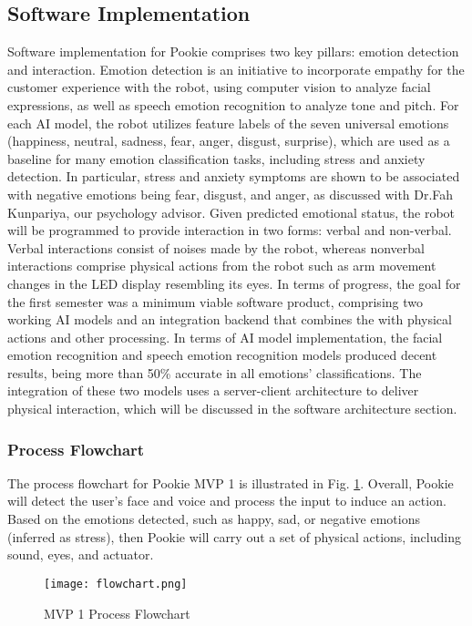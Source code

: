 \subsection{Software Implementation}
Software implementation for Pookie comprises two key pillars: emotion detection and interaction. Emotion detection is an initiative to incorporate empathy for the customer experience with the robot, using computer vision to analyze facial expressions, as well as speech emotion recognition to analyze tone and pitch. For each AI model, the robot utilizes feature labels of the seven universal emotions (happiness, neutral, sadness, fear, anger, disgust, surprise), which are used as a baseline for many emotion classification tasks, including stress and anxiety detection. In particular, stress and anxiety symptoms are shown to be associated with negative emotions being fear, disgust, and anger, as discussed with Dr.Fah Kunpariya, our psychology advisor. Given predicted emotional status, the robot will be programmed to provide interaction in two forms: verbal and non-verbal. Verbal interactions consist of noises made by the robot, whereas nonverbal interactions comprise physical actions from the robot such as arm movement changes in the LED display resembling its eyes. 
In terms of progress, the goal for the first semester was a minimum viable software product, comprising two working AI models and an integration backend that combines the with physical actions and other processing. In terms of AI model implementation, the facial emotion recognition and speech emotion recognition models produced decent results, being more than 50\% accurate in all emotions’ classifications. The integration of these two models uses a server-client architecture to deliver physical interaction, which will be discussed in the software architecture section.

\subsubsection{Process Flowchart}
The process flowchart for Pookie MVP 1 is illustrated in Fig. \ref{fig:flowchart}. Overall, Pookie will detect the user’s face and voice and process the input to induce an action. Based on the emotions detected, such as happy, sad, or negative emotions (inferred as stress), then Pookie will carry out a set of physical actions, including sound, eyes, and actuator. 

\begin{figure}[ht]
    \centering
    \texttt{[image: flowchart.png]}
    \caption{MVP 1 Process Flowchart}
    \label{fig:flowchart}
\end{figure}

